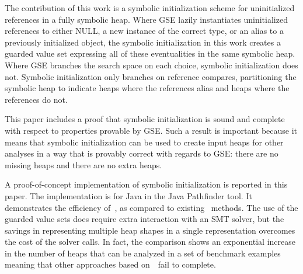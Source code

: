 The contribution of this work is a symbolic initialization scheme for
uninitialized references in a fully symbolic heap. Where GSE lazily
instantiates uninitialized references to either NULL, a new instance
of the correct type, or an alias to a previously initialized object,
the symbolic initialization in this work creates a guarded value set
expressing all of these eventualities in the same symbolic heap. Where
GSE branches the search space on each choice, symbolic initialization
does not. Symbolic initialization only branches on reference compares,
partitioning the symbolic heap to indicate heaps where the references
alias and heaps where the references do not.

This paper includes a proof that symbolic initialization is sound and
complete with respect to properties provable by GSE. Such a result is
important because it means that symbolic initialization can be used to
create input heaps for other analyses in a way that is provably
correct with regards to GSE: there are no missing heaps and there are
no extra heaps.

A proof-of-concept implementation of symbolic initialization is
reported in this paper. The implementation is for Java in the Java
Pathfinder tool. It demonstrates the efficiency of~\symtxt{}, as
compared to existing~\gsetxt{} methods. The use of the guarded value
sets does require extra interaction with an SMT solver, but the
savings in representing multiple heap shapes in a single
representation overcomes the cost of the solver calls. In fact, the
comparison shows an exponential increase in the number of heaps that
can be analyzed in a set of benchmark examples meaning that other
approaches based on~\gsetxt\ fail to complete.

